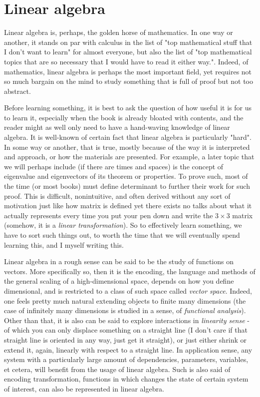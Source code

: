 \chapter{Linear algebra}
Linear algebra is, perhaps, the golden horse of mathematics. In one way or another, it stands on par with calculus in the list of "top mathematical stuff that I don't want to learn" for almost everyone, but also the list of "top mathematical topics that are so necessary that I would have to read it either way.". Indeed, of mathematics, linear algebra is perhaps the most important field, yet requires not so much bargain on the mind to study something that is full of proof but not too abstract. 

Before learning something, it is best to ask the question of how useful it is for us to learn it, especially when the book is already bloated with contents, and the reader might as well only need to have a hand-waving knowledge of linear algebra. It is well-known of certain fact that linear algebra is particularly "hard". In some way or another, that is true, mostly because of the way it is interpreted and approach, or how the materials are presented. For example, a later topic that we will perhaps include (if there are times and spaces) is the concept of eigenvalue and eigenvectors of its theorem or properties. To prove such, most of the time (or most books) must define determinant to further their work for such proof. This is difficult, nonintuitive, and often derived without any sort of motivation just like how matrix is defined yet there exists no talks about what it actually represents every time you put your pen down and write the $3\times 3$ matrix (somehow, it is a \textit{linear transformation}). So to effectively learn something, we have to sort such things out, to worth the time that we will eventually spend learning this, and I myself writing this. 

Linear algebra in a rough sense can be said to be the study of functions on vectors. More specifically so, then it is the encoding, the language and methods of the general scaling of a high-dimensional space, depends on how you define dimensional, and is restricted to a class of such space called \textit{vector space}. Indeed, one feels pretty much natural extending objects to finite many dimensions (the case of infinitely many dimensions is studied in a sense, of \textit{functional analysis}). Other than that, it is also can be said to explore interactions in \textit{linearity sense} - of which you can only displace something on a straight line (I don't care if that straight line is oriented in any way, just get it straight), or just either shrink or extend it, again, linearly with respect to a straight line. In application sense, any system with a particularly large amount of dependencies, parameters, variables, et cetera, will benefit from the usage of linear algebra. Such is also said of encoding transformation, functions in which changes the state of certain system of interest, can also be represented in linear algebra. 

